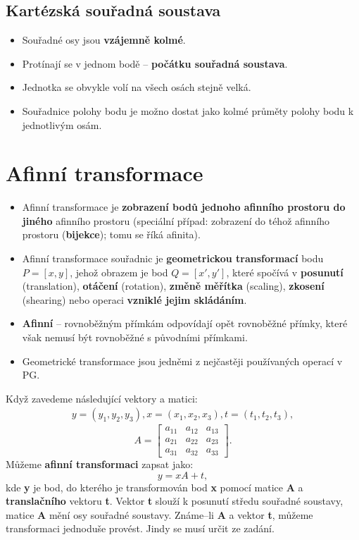 \subsection{Kartézská souřadná soustava}
\begin{itemize}
    \item Souřadné osy jsou \textbf{vzájemně kolmé}.
    \item Protínají se v jednom bodě -- \textbf{počátku souřadná soustava}.
    \item Jednotka se obvykle volí na všech osách stejně velká.
    \item Souřadnice polohy bodu je možno dostat jako kolmé průměty polohy bodu k jednotlivým osám.
\end{itemize}

\section{Afinní transformace}
\begin{itemize}
    \item Afinní transformace je \textbf{zobrazení bodů jednoho afinního prostoru do jiného} afinního prostoru (speciální případ: zobrazení do téhož afinního prostoru (\textbf{bijekce}); tomu se říká afinita).
    \item Afinní transformace souřadnic je \textbf{geometrickou transformací} bodu $P=[x,y]$, jehož obrazem je bod $Q=[x',y']$, které spočívá v \textbf{posunutí} (translation), \textbf{otáčení} (rotation), \textbf{změně měřítka} (scaling), \textbf{zkosení} (shearing) nebo operaci \textbf{vzniklé jejim skládáním}.
    \item \textbf{Afinní} -- rovnoběžným přímkám odpovídají opět rovnoběžné přímky, které však nemusí být rovnoběžné s původními přímkami.
    \item Geometrické transformace jsou jedněmi z nejčastěji používaných operací v PG.
\end{itemize}
Když zavedeme následující vektory a matici:
\begin{equation*}
    \begin{aligned}
        y = (y_1,y_2,y_3),  x = (x_1,x_2,x_3), t = (t_1,t_2,t_3),
    \end{aligned}
\end{equation*}
\begin{equation*}
    A = \begin{bmatrix}
        a_{11} & a_{12} & a_{13} \\[0.3em]
        a_{21} & a_{22} & a_{23} \\[0.3em]
        a_{31} & a_{32} & a_{33}
    \end{bmatrix}.
\end{equation*}
Můžeme \textbf{afinní transformaci} zapsat jako:
\begin{equation*}
    y = xA + t,
\end{equation*}
kde \textbf{y} je bod, do kterého je transformován bod \textbf{x} pomocí matice \textbf{A} a \textbf{translačního} vektoru \textbf{t}. Vektor \textbf{t} slouží k posunutí středu souřadné soustavy, matice \textbf{A} mění osy souřadné soustavy. Známe--li \textbf{A} a vektor \textbf{t}, můžeme transformaci jednoduše provést. Jindy se musí určit ze zadání.

